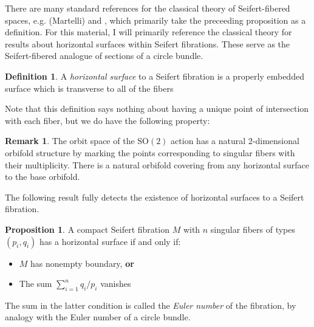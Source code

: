 \documentclass[10pt, oneside]{article}
\theoremstyle{definition}
\newtheorem{defn}{Definition}
\newtheorem{rem}{Remark}
\newtheorem{prop}{Proposition}
\theoremstyle{definition}
\begin{document}
    There are many standard references for the classical theory of Seifert-fibered spaces, e.g. \cite{martelli}(Martelli) and \cite{hatcher-3mflds}, which primarily take the preceeding proposition as a definition. For this material, I will primarily reference the classical theory for results about horizontal surfaces within Seifert fibrations. These serve as the Seifert-fibered analogue of sections of a circle bundle. 

    \begin{defn}
        A {\it horizontal surface} to a Seifert fibration is a properly embedded surface which is transverse to all of the fibers
    \end{defn}
    
    Note that this definition says nothing about having a unique point of intersection with each fiber, but we do have the following property:

    \begin{rem}
        The orbit space of the $\text{SO}(2)$ action has a natural 2-dimensional orbifold structure by marking the points corresponding to singular fibers with their multiplicity. There is a natural orbifold covering from any horizontal surface to the base orbifold.
    \end{rem}

     The following result fully detects the existence of horizontal surfaces to a Seifert fibration.

     \begin{prop}
         A compact Seifert fibration $M$ with $n$ singular fibers of types $(p_i, q_i)$ has a horizontal surface if and only if:
         \begin{itemize}
             \item $M$ has nonempty boundary, {\bf or}
             \item The sum $\sum_{i=1}^{n} q_i/p_i$ vanishes
         \end{itemize}
     \end{prop}

    The sum in the latter condition is called the {\it Euler number} of the fibration, by analogy with the Euler number of a circle bundle. 
    
\end{document}
